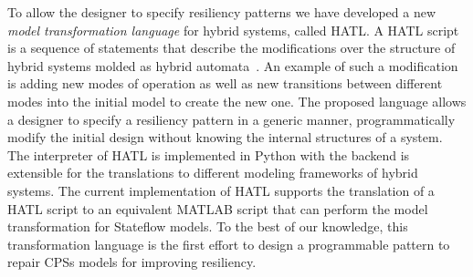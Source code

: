 %
%
To allow the designer to specify resiliency patterns we have developed a new \emph{model transformation language} for hybrid systems, called HATL.
%
A HATL script is a sequence of statements that describe the modifications over the structure of hybrid systems molded as hybrid automata~\cite{alur1995algorithmic}.  An example of such a modification is adding new modes of operation as well as new transitions between different modes into the initial model to create the new one. 
%
The proposed language allows a designer to specify a resiliency pattern in a generic manner, programmatically modify the initial design without knowing the internal structures of a system. The interpreter of HATL is implemented in Python with the backend is extensible for the translations to different modeling frameworks of hybrid systems. The current implementation of HATL supports the translation of a HATL script to an equivalent MATLAB script that can perform the model transformation for Stateflow models.
%
To the best of our knowledge, this transformation language is the first effort to design a programmable pattern to repair CPSs models for improving resiliency.
%

